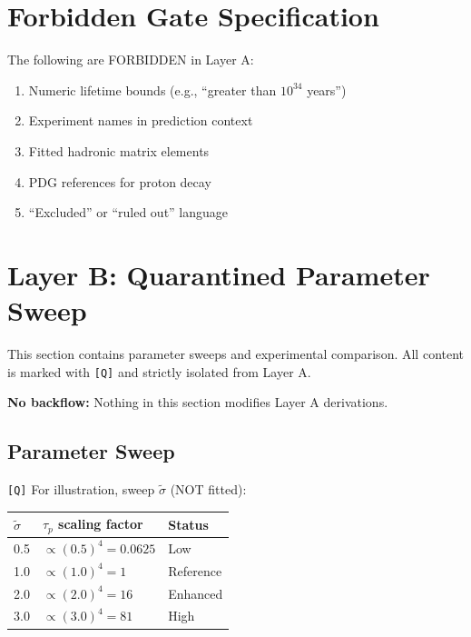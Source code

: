 \documentclass[11pt,a4paper]{article}
\newcommand{\tagQ}{\textcolor{red!70!black}{\texttt{[Q]}}}
\theoremstyle{definition}
\begin{document}

\section{Forbidden Gate Specification}
\label{sec:forbidden-gate}

\begin{forbiddenbox}
The following are FORBIDDEN in Layer A:
\begin{enumerate}
  \item Numeric lifetime bounds (e.g., ``greater than $10^{34}$ years'')
  \item Experiment names in prediction context
  \item Fitted hadronic matrix elements
  \item PDG references for proton decay
  \item ``Excluded'' or ``ruled out'' language
\end{enumerate}
\end{forbiddenbox}

\newpage
\section{Layer B: Quarantined Parameter Sweep}
\label{sec:layer-b}


\begin{quarantinebox}
This section contains parameter sweeps and experimental comparison.
All content is marked with \tagQ{} and strictly isolated from Layer A.

\textbf{No backflow:} Nothing in this section modifies Layer A derivations.
\end{quarantinebox}

\subsection{Parameter Sweep}
\label{subsec:param-sweep}

\tagQ{} For illustration, sweep $\tilde{\sigma}$ (NOT fitted):
\begin{center}
\begin{tabular}{lll}
\toprule
$\tilde{\sigma}$ & $\tau_p$ scaling factor & Status \\
\midrule
0.5 & $\propto (0.5)^4 = 0.0625$ & Low \\
1.0 & $\propto (1.0)^4 = 1$ & Reference \\
2.0 & $\propto (2.0)^4 = 16$ & Enhanced \\
3.0 & $\propto (3.0)^4 = 81$ & High \\
\bottomrule
\end{tabular}
\end{center}
\end{document}

